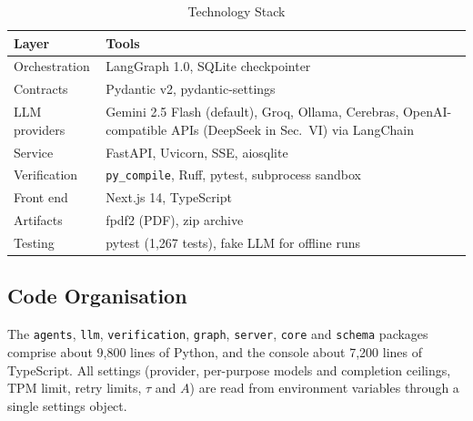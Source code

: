 \documentclass[conference,letterpaper]{IEEEtran}
\begin{document}
\begin{table}[t]
\caption{Technology Stack}
\label{tab:stack}
\centering
\footnotesize
\begin{tabular}{@{}l>{\raggedright\arraybackslash}p{5.1cm}@{}}
\toprule
Layer & Tools \\
\midrule
Orchestration & LangGraph 1.0, SQLite checkpointer \\
Contracts     & Pydantic v2, pydantic-settings \\
LLM providers & Gemini 2.5 Flash (default), Groq, Ollama, Cerebras, OpenAI-compatible APIs (DeepSeek in Sec.~VI) via LangChain \\
Service       & FastAPI, Uvicorn, SSE, aiosqlite \\
Verification  & \texttt{py\_compile}, Ruff, pytest, subprocess sandbox \\
Front end     & Next.js 14, TypeScript \\
Artifacts     & fpdf2 (PDF), zip archive \\
Testing       & pytest (1{,}267 tests), fake LLM for offline runs \\
\bottomrule
\end{tabular}
\end{table}

\subsection{Code Organisation}
The \texttt{agents}, \texttt{llm}, \texttt{verification}, \texttt{graph},
\texttt{server}, \texttt{core} and \texttt{schema} packages comprise about
9{,}800 lines of Python, and the console about 7{,}200 lines of TypeScript. All
settings (provider, per-purpose models and completion ceilings, TPM limit, retry
limits, $\tau$ and $A$) are read from environment variables through a single
settings object.
\end{document}
